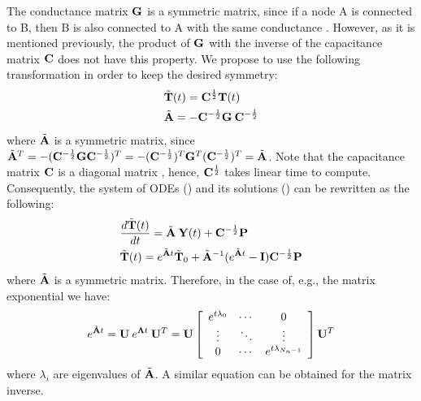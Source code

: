 The conductance matrix $\mathbf{G}$ is a symmetric matrix, since if a node A is connected to B, then B is also connected to A with the same conductance \cite{huang2003}. However, as it is mentioned previously, the product of $\mathbf{G}$ with the inverse of the capacitance matrix $\mathbf{C}$ does not have this property. We propose to use the following transformation in order to keep the desired symmetry:
\begin{align}
  & \tilde{\mathbf{T}}(t) = \mathbf{C}^{\frac{1}{2}} \mathbf{T}(t) \label{eq:substitution} \\
  & \tilde{\mathbf{A}} = -\mathbf{C}^{-\frac{1}{2}} \mathbf{G} \: \mathbf{C}^{-\frac{1}{2}} \nonumber
\end{align}
where $\tilde{\mathbf{A}}$ is a symmetric matrix, since $\tilde{\mathbf{A}}^T = -(\mathbf{C}^{-\frac{1}{2}} \mathbf{G} \mathbf{C}^{-\frac{1}{2}})^T = -(\mathbf{C}^{-\frac{1}{2}})^T \mathbf{G}^T (\mathbf{C}^{-\frac{1}{2}})^T = \tilde{\mathbf{A}}$. Note that the capacitance matrix $\mathbf{C}$ is a diagonal matrix \cite{huang2003}, hence, $\mathbf{C}^{\frac{1}{2}}$ takes linear time to compute. Consequently, the system of ODEs () and its solutions () can be rewritten as the following:
\begin{align*}
  & \frac{d\tilde{\mathbf{T}}(t)}{dt} = \tilde{\mathbf{A}} \: \mathbf{Y}(t) + \mathbf{C}^{-\frac{1}{2}} \mathbf{P} \\
  & \tilde{\mathbf{T}}(t) = e^{\tilde{\mathbf{A}} t} \tilde{\mathbf{T}}_0 + \tilde{\mathbf{A}}^{-1} (e^{\tilde{\mathbf{A}} t} - \mathbf{I}) \mathbf{C}^{-\frac{1}{2}} \mathbf{P}
\end{align*}
where $\tilde{\mathbf{A}}$ is a symmetric matrix. Therefore, in the case of, e.g., the matrix exponential we have:
\begin{equation} \label{eq:matrix-exponential}
  e^{\tilde{\mathbf{A}} t} = \mathbf{U} \: e^{\mathbf{\Lambda} t} \: \mathbf{U}^T = \mathbf{U} \left[
      \begin{array}{ccc}
        e^{t \lambda_0} & \cdots & 0 \\
        \vdots & \ddots & \vdots \\
        0 & \cdots & e^{t \lambda_{N_n - 1}}
      \end{array}
    \right] \mathbf{U}^T
\end{equation}
where $\lambda_i$ are eigenvalues of $\tilde{\mathbf{A}}$. A similar equation can be obtained for the matrix inverse.

